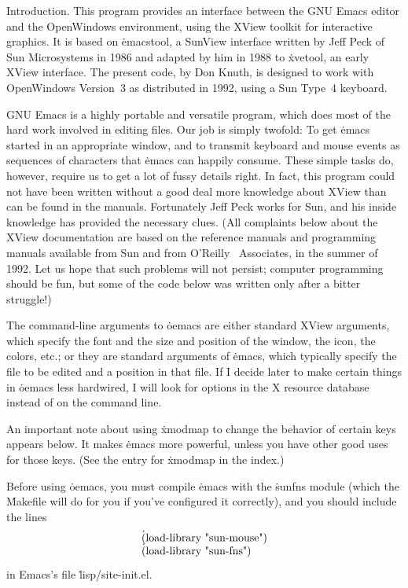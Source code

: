 
\datethis




Introduction.
This program provides an interface between the GNU Emacs editor and the
OpenWindows environment, using the XView toolkit for interactive graphics.
It is based on \.{emacstool}, a SunView interface written by Jeff Peck
of Sun Microsystems in 1986 and adapted by him in 1988 to \.{xvetool},
an early XView interface. The present code, by Don Knuth, is designed to work
with OpenWindows Version~3 as distributed in 1992, using a Sun Type~4
keyboard.

GNU Emacs is a highly portable and versatile program, which does most
of the hard work involved in editing files. Our job is simply twofold:
To get \.{emacs} started in an appropriate window, and to transmit
keyboard and mouse events as sequences of characters that \.{emacs}
can happily consume.  These simple tasks do, however, require us to
get a lot of fussy details right. In fact, this program could not have been
written without a good deal more knowledge about XView than can be found
in the manuals. Fortunately Jeff Peck works for Sun, and his
inside knowledge has provided the necessary clues. (All complaints below
about the XView documentation are based on the reference manuals and
programming manuals available from Sun and from O'Reilly \AM\ Associates, in
the summer of 1992. Let us hope that such problems will not persist;
computer programming should be fun, but some of the code below was
written only after a bitter struggle!)

The command-line arguments to \.{oemacs} are either standard XView
arguments, which specify the font and the size and position of the window,
the icon, the colors, etc.; or they are standard arguments of \.{emacs},
which typically specify the file to be edited and a position in that file.
If I decide later to make certain things in \.{oemacs} less hardwired,
I will look for options in the X resource database instead of on the
command line.

An important note about using \.{xmodmap} to change the behavior of
certain keys appears below. It makes \.{emacs} more powerful, unless you
have other good uses for those keys. (See the entry for \.{xmodmap}
in the index.)

Before using \.{oemacs}, you must compile \.{emacs} with the
\.{sunfns} module (which the \.{Makefile} will do for you if you've
configured it correctly), and you should include the lines
$$\vbox{\halign{\.{#}\hfil\cr
(load-library "sun-mouse")\cr
(load-library "sun-fns")\cr}}$$
in Emacs's file \.{lisp/site-init.el}.

